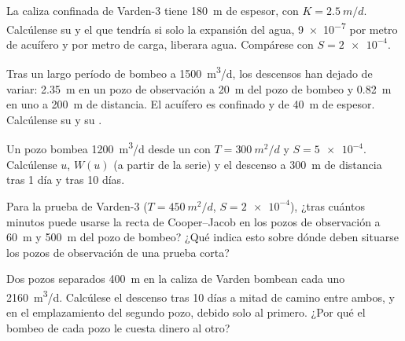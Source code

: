 \begin{exercise}[$\star$]\label{exo:b3:hydrogeology:4}
La caliza confinada de Varden-3 tiene \qty{180}{m} de espesor, con $K =
\qty{2.5}{m/d}$. Calcúlense su  y el  que tendría si
solo la expansión del agua, \num{9e-7} por metro de acuífero y por metro de carga, liberara agua.
Compárese con $S = \num{2e-4}$.
\end{exercise}

\begin{exercise}[$\star\star$]\label{exo:b3:hydrogeology:5}
Tras un largo período de bombeo a \qty{1500}{m^3/d}, los descensos han
dejado de variar: \qty{2.35}{m} en un pozo de observación a \qty{20}{m} del
pozo de bombeo y \qty{0.82}{m} en uno a \qty{200}{m} de distancia. El acuífero es
confinado y de \qty{40}{m} de espesor. Calcúlense su  y su .
\end{exercise}

\begin{exercise}[$\star\star$]\label{exo:b3:hydrogeology:6}
Un pozo bombea \qty{1200}{m^3/d} desde un  con $T =
\qty{300}{m^2/d}$ y $S = \num{5e-4}$. Calcúlense $u$, $W(u)$ (a partir de la
serie) y el descenso a \qty{300}{m} de distancia tras 1 día y tras 10 días.
\end{exercise}

\begin{exercise}[$\star\star$]\label{exo:b3:hydrogeology:7}
Para la prueba de Varden-3 ($T = \qty{450}{m^2/d}$, $S = \num{2e-4}$), ¿tras cuántos
minutos puede usarse la recta de Cooper--Jacob en los pozos de observación a \qty{60}{m} y
\qty{500}{m} del pozo de bombeo? ¿Qué indica esto sobre dónde deben situarse los
pozos de observación de una prueba corta?
\end{exercise}

\begin{exercise}[$\star\star$]\label{exo:b3:hydrogeology:8}
Dos pozos separados \qty{400}{m} en la caliza de Varden bombean cada uno
\qty{2160}{m^3/d}. Calcúlese el descenso tras 10 días a mitad de camino entre ambos,
y en el emplazamiento del segundo pozo, debido solo al primero. ¿Por qué el bombeo de cada
pozo le cuesta dinero al otro?
\end{exercise}

